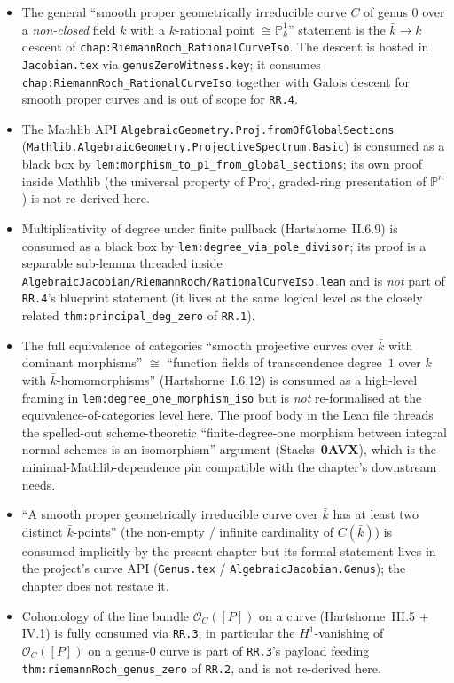 \begin{itemize}
  \item The general ``smooth proper geometrically irreducible curve \(C\) of
    genus \(0\) over a \emph{non-closed} field \(k\) with a \(k\)-rational point
    \(\cong \mathbb P^1_k\)'' statement is the \(\bar k \to k\) descent of
    \texttt{chap:RiemannRoch_RationalCurveIso}. The descent is hosted in
    \texttt{Jacobian.tex} via \texttt{genusZeroWitness.key}; it consumes
    \texttt{chap:RiemannRoch_RationalCurveIso} together with Galois descent for
    smooth proper curves and is out of scope for \texttt{RR.4}.
  \item The Mathlib API \texttt{AlgebraicGeometry.Proj.fromOfGlobalSections}
    (\texttt{Mathlib.AlgebraicGeometry.ProjectiveSpectrum.Basic}) is
    consumed as a black box by
    \texttt{lem:morphism_to_p1_from_global_sections}; its own proof inside
    Mathlib (the universal property of \(\mathrm{Proj}\), graded-ring
    presentation of \(\mathbb P^n\)) is not re-derived here.
  \item Multiplicativity of degree under finite pullback (Hartshorne~II.6.9)
    is consumed as a black box by \texttt{lem:degree_via_pole_divisor};
    its proof is a separable sub-lemma threaded inside
    \texttt{AlgebraicJacobian/RiemannRoch/RationalCurveIso.lean} and is
    \emph{not} part of \texttt{RR.4}'s blueprint statement (it lives at
    the same logical level as the closely related
    \texttt{thm:principal_deg_zero} of \texttt{RR.1}).
  \item The full equivalence of categories ``smooth projective curves over
    \(\bar k\) with dominant morphisms'' \(\cong\) ``function fields of
    transcendence degree~\(1\) over \(\bar k\) with \(\bar k\)-homomorphisms''
    (Hartshorne~I.6.12) is consumed as a high-level framing in
    \texttt{lem:degree_one_morphism_iso} but is \emph{not} re-formalised at
    the equivalence-of-categories level here. The proof body in the Lean
    file threads the spelled-out scheme-theoretic ``finite-degree-one
    morphism between integral normal schemes is an isomorphism''
    argument (Stacks~\textbf{0AVX}), which is the minimal-Mathlib-dependence
    pin compatible with the chapter's downstream needs.
  \item ``A smooth proper geometrically irreducible curve over \(\bar k\)
    has at least two distinct \(\bar k\)-points'' (the non-empty / infinite
    cardinality of \(C(\bar k)\)) is consumed implicitly by the present
    chapter but its formal statement lives in the project's curve API
    (\texttt{Genus.tex} / \texttt{AlgebraicJacobian.Genus}); the chapter
    does not restate it.
  \item Cohomology of the line bundle \(\mathcal O_C([P])\) on a curve
    (Hartshorne~III.5 + IV.1) is fully consumed via \texttt{RR.3}; in
    particular the \(H^1\)-vanishing of \(\mathcal O_C([P])\) on a genus-\(0\)
    curve is part of \texttt{RR.3}'s payload feeding
    \texttt{thm:riemannRoch_genus_zero} of \texttt{RR.2}, and is not
    re-derived here.
\end{itemize}
